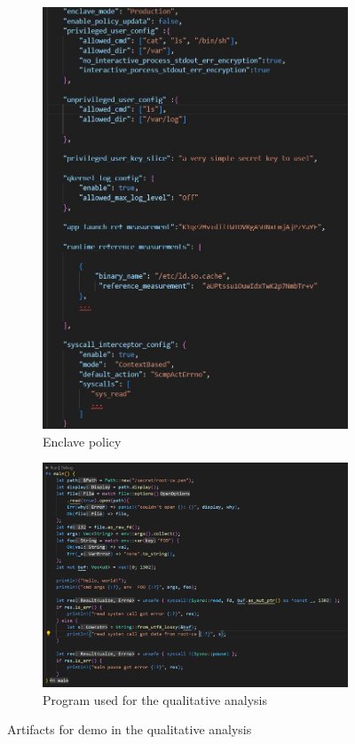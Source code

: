\begin{figure}[!htb] 
    \begin{subfigure}[b]{0.45\linewidth}
      \centering
      \includegraphics[width=0.9\linewidth]{images/generic_policy.PNG} 
      \caption{Enclave policy} 
      \label{fig:generic_policy} 
      \vspace{4ex}
    \end{subfigure}%
    \begin{subfigure}[b]{0.45\linewidth}
      \centering
      \includegraphics[width=0.9\linewidth]{images/analysis_workload.png} 
      \caption{Program used for the qualitative analysis} 
      \label{fig:analysis_workload} 
      \vspace{4ex}
    \end{subfigure} 
    \caption{Artifacts for demo in the qualitative analysis}
    \label{fig4} 
\end{figure}




